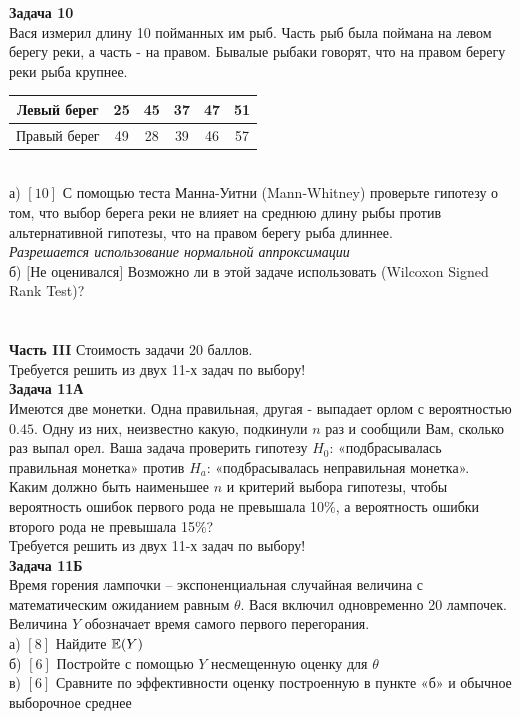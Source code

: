 \documentclass[12pt, a4paper]{article}\usepackage[]{graphicx}\usepackage[]{color}
\begin{document}
	\textbf{Задача 10} \\ %
	Вася измерил длину 10 пойманных им рыб. Часть рыб была поймана на
	левом берегу реки, а часть - на правом. Бывалые рыбаки говорят,
	что на правом берегу реки рыба крупнее. \\
	\begin{tabular}{|c|c|c|c|c|c|}
		\hline
		Левый берег & 25 & 45 & 37 & 47 & 51   \\
		\hline
		Правый берег & 49 & 28 & 39 & 46 & 57   \\
		\hline
	\end{tabular} \\
	а) $[10]$ С помощью теста Манна-Уитни (Mann-Whitney) проверьте
	гипотезу о том, что выбор берега реки не влияет на среднюю длину
	рыбы против
	альтернативной гипотезы, что на правом берегу рыба длиннее. \\
	\emph{Разрешается использование нормальной аппроксимации} \\
	б) $[$Не оценивался$]$ Возможно ли в этой задаче использовать
	(Wilcoxon Signed Rank
	Test)? \\ \\ \\


	\textbf{Часть III} Стоимость задачи 20 баллов. \\

	Требуется решить \textbf{} из двух 11-х задач по
	выбору! \\


	\textbf{Задача 11А} \\
	Имеются две монетки. Одна правильная, другая - выпадает орлом с
	вероятностью $0.45$. Одну из них, неизвестно какую, подкинули $n$
	раз и сообщили Вам, сколько раз выпал орел. Ваша задача проверить
	гипотезу $H_{0}$: «подбрасывалась правильная монетка» против
	$H_{a}$:
	«подбрасывалась неправильная монетка». \\
	Каким должно быть наименьшее $n$ и критерий выбора гипотезы, чтобы
	вероятность ошибок первого рода не превышала 10\%, а вероятность
	ошибки второго рода не превышала 15\%? \\

	Требуется решить \textbf{} из двух 11-х задач по
	выбору! \\

	\textbf{Задача 11Б} \\
	Время горения лампочки – экспоненциальная случайная величина с
	математическим ожиданием равным $\theta $. Вася включил
	одновременно 20 лампочек. Величина  $Y$ обозначает время самого
	первого перегорания. \\
	а) $[8]$ Найдите $\mathbb{E}(Y)$ \\
	б) $[6]$ Постройте с помощью  $Y$ несмещенную оценку для  $\theta$ \\
	в) $[6]$ Сравните по эффективности оценку построенную в пункте
	«б» и
	обычное выборочное среднее \\
\end{document}
